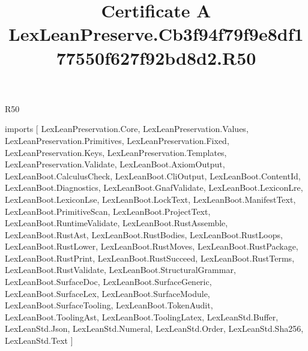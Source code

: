 \begin{lexlean}{R50}
\title{Certificate A LexLeanPreserve.Cb3f94f79f9e8df177550f627f92bd8d2.R50}
\begin{coremodule}
imports [
  LexLeanPreservation.Core,
  LexLeanPreservation.Values,
  LexLeanPreservation.Primitives,
  LexLeanPreservation.Fixed,
  LexLeanPreservation.Keys,
  LexLeanPreservation.Templates,
  LexLeanPreservation.Validate,
  LexLeanBoot.AxiomOutput,
  LexLeanBoot.CalculusCheck,
  LexLeanBoot.CliOutput,
  LexLeanBoot.ContentId,
  LexLeanBoot.Diagnostics,
  LexLeanBoot.GnafValidate,
  LexLeanBoot.LexiconLre,
  LexLeanBoot.LexiconLse,
  LexLeanBoot.LockText,
  LexLeanBoot.ManifestText,
  LexLeanBoot.PrimitiveScan,
  LexLeanBoot.ProjectText,
  LexLeanBoot.RuntimeValidate,
  LexLeanBoot.RustAssemble,
  LexLeanBoot.RustAst,
  LexLeanBoot.RustBodies,
  LexLeanBoot.RustLoops,
  LexLeanBoot.RustLower,
  LexLeanBoot.RustMoves,
  LexLeanBoot.RustPackage,
  LexLeanBoot.RustPrint,
  LexLeanBoot.RustSucceed,
  LexLeanBoot.RustTerms,
  LexLeanBoot.RustValidate,
  LexLeanBoot.StructuralGrammar,
  LexLeanBoot.SurfaceDoc,
  LexLeanBoot.SurfaceGeneric,
  LexLeanBoot.SurfaceLex,
  LexLeanBoot.SurfaceModule,
  LexLeanBoot.SurfaceTooling,
  LexLeanBoot.TokenAudit,
  LexLeanBoot.ToolingAst,
  LexLeanBoot.ToolingLatex,
  LexLeanStd.Buffer,
  LexLeanStd.Json,
  LexLeanStd.Numeral,
  LexLeanStd.Order,
  LexLeanStd.Sha256,
  LexLeanStd.Text
]


\end{coremodule}
\end{lexlean}
